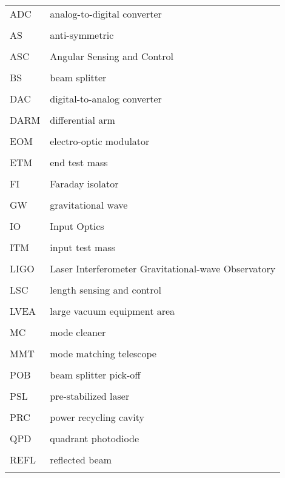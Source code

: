 \singlespacing
\begin{tabular}{lp{5in}}
ADC & analog-to-digital converter \\
\\
AS & anti-symmetric \\
\\
ASC & Angular Sensing and Control \\
\\
BS & beam splitter \\
\\
DAC & digital-to-analog converter\\
\\
DARM & differential arm \\
\\
EOM & electro-optic modulator \\
\\
ETM & end test mass \\
\\
FI & Faraday isolator \\
\\
GW & gravitational wave \\
\\
IO & Input Optics \\
\\
ITM & input test mass \\
\\
LIGO & Laser Interferometer Gravitational-wave Observatory \\
\\
LSC & length sensing and control \\
\\
LVEA & large vacuum equipment area \\
\\
MC & mode cleaner \\
\\
MMT & mode matching telescope \\
\\
POB & beam splitter pick-off \\
\\
PSL & pre-stabilized laser \\
\\
PRC & power recycling cavity \\
\\
QPD & quadrant photodiode \\
\\
REFL & reflected beam \\
\\
\end{tabular}
\doublespacing



